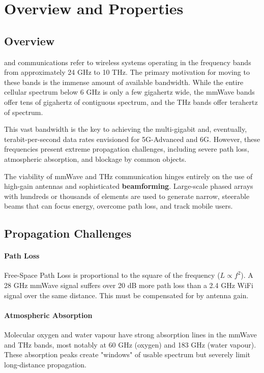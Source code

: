 \section{Overview and Properties}

\subsection{Overview}

 and  communications refer to wireless systems operating in the frequency bands from approximately 24 GHz to 10 THz. The primary motivation for moving to these bands is the immense amount of available bandwidth. While the entire cellular spectrum below 6 GHz is only a few gigahertz wide, the mmWave bands offer tens of gigahertz of contiguous spectrum, and the THz bands offer terahertz of spectrum.

This vast bandwidth is the key to achieving the multi-gigabit and, eventually, terabit-per-second data rates envisioned for 5G-Advanced and 6G. However, these frequencies present extreme propagation challenges, including severe path loss, atmospheric absorption, and blockage by common objects.

\begin{keyconcept}
    The viability of mmWave and THz communication hinges entirely on the use of high-gain antennas and sophisticated \textbf{beamforming}. Large-scale phased arrays with hundreds or thousands of elements are used to generate narrow, steerable beams that can focus energy, overcome path loss, and track mobile users.
\end{keyconcept}


\subsection{Propagation Challenges}

\paragraph{Path Loss}
Free-Space Path Loss is proportional to the square of the frequency ($L \propto f^2$). A 28 GHz mmWave signal suffers over 20 dB more path loss than a 2.4 GHz WiFi signal over the same distance. This must be compensated for by antenna gain.

\paragraph{Atmospheric Absorption}
Molecular oxygen and water vapour have strong absorption lines in the mmWave and THz bands, most notably at 60 GHz (oxygen) and 183 GHz (water vapour). These absorption peaks create "windows" of usable spectrum but severely limit long-distance propagation.

